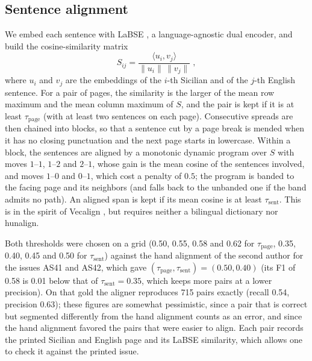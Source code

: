 \documentclass[11pt,a4paper]{article}
\begin{document}


\subsection{Sentence alignment}
\label{sec:alignment}
We embed each sentence with LaBSE \citep{feng2022labse}, a language-agnostic dual encoder, and
build the cosine-similarity matrix
\[
  S_{ij}=\frac{\langle u_i,v_j\rangle}{\lVert u_i\rVert\,\lVert v_j\rVert} \; ,
\]
where $u_i$ and $v_j$ are the embeddings of the $i$-th Sicilian and of the $j$-th English
sentence. For a pair of pages, the similarity is the larger of the mean row maximum and the mean
column maximum of $S$, and the pair is kept if it is at least $\tau_{\text{page}}$ (with at least
two sentences on each page). Consecutive spreads are then chained into blocks, so that a sentence
cut by a page break is mended when it has no closing punctuation and the next page starts in
lowercase. Within a block, the sentences are aligned by a monotonic dynamic program over $S$
with moves $1$--$1$, $1$--$2$ and $2$--$1$, whose gain is the mean cosine of the sentences
involved, and moves $1$--$0$ and $0$--$1$, which cost a penalty of $0.5$; the program is banded
to the facing page and its neighbors (and falls back to the unbanded one if the band admits no
path). An aligned span is kept if its mean cosine is at least $\tau_{\text{sent}}$. This is in
the spirit of Vecalign \citep{thompson2019vecalign}, but requires neither a bilingual dictionary
nor hunalign.

Both thresholds were chosen on a grid (0.50, 0.55, 0.58 and 0.62 for $\tau_{\text{page}}$, 0.35,
0.40, 0.45 and 0.50 for $\tau_{\text{sent}}$) against the hand alignment of the second author
for the issues AS41 and AS42, which gave $(\tau_{\text{page}},\tau_{\text{sent}})=(0.50,0.40)$ (its F1 of 0.58 is 0.01 below that of
$\tau_{\text{sent}}=0.35$, which keeps more pairs at a lower precision).
On that gold the aligner reproduces 715 pairs exactly (recall 0.54, precision 0.63); these
figures are somewhat pessimistic, since a pair that is correct but segmented differently from
the hand alignment counts as an error, and since the hand alignment favored
the pairs that were easier to align.  Each pair records the printed Sicilian and English
page and its LaBSE similarity, which allows one to check it against the printed issue.

\end{document}
